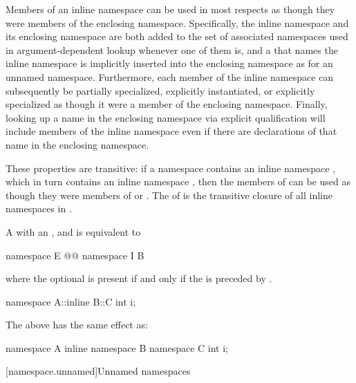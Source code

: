 \pnum
Members of an inline namespace can be used in most respects as though they were members
of the enclosing namespace. Specifically, the inline namespace and its enclosing
namespace are both added to the set of associated namespaces used in
argument-dependent lookup whenever one of them is,
and a  that names the inline
namespace is implicitly inserted into the enclosing namespace as for an unnamed
namespace. Furthermore, each
member of the inline namespace can subsequently be partially
specialized, explicitly
instantiated, or explicitly specialized as
though it were a member of the enclosing namespace. Finally, looking up a name in the
enclosing namespace via explicit qualification will include
members of the inline namespace even if
there are declarations of that name in the enclosing namespace.

\pnum
These properties are transitive: if a namespace  contains an inline namespace
, which in turn contains an inline namespace , then the members of
 can be used as though they were members of  or .
The  of  is the transitive closure of all
inline namespaces in .

\pnum
A  with an
 ,
  and
 
is equivalent to
\begin{codeblock}
namespace E { @@ namespace I { B } }
\end{codeblock}
where the optional  is present if and only if
the   is preceded by .
\begin{example}
\begin{codeblock}
namespace A::inline B::C {
  int i;
}
\end{codeblock}
The above has the same effect as:
\begin{codeblock}
namespace A {
  inline namespace B {
    namespace C {
      int i;
    }
  }
}
\end{codeblock}
\end{example}

[namespace.unnamed]{Unnamed namespaces}%

